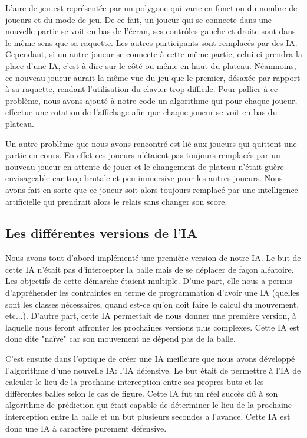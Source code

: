 L'aire de jeu est représentée par un polygone qui varie en fonction du nombre de joueurs et du mode de jeu. De ce fait, un joueur qui se connecte dans une nouvelle partie se voit en bas de l'écran, ses contrôles gauche et droite sont dans le même sens que sa raquette. Les autres participants sont remplacés par des IA. Cependant, si un autre joueur se connecte à cette même partie, celui-ci prendra la place d'une IA, c'est-à-dire sur le côté ou même en haut du plateau. Néanmoins, ce nouveau joueur aurait la même vue du jeu que le premier, désaxée par rapport à sa raquette, rendant l'utilisation du clavier trop difficile. Pour pallier à ce problème, nous avons ajouté à notre code un algorithme qui pour chaque joueur, effectue une rotation de l'affichage afin que chaque joueur se voit en bas du plateau.


Un autre problème que nous avons rencontré est lié aux joueurs qui quittent une partie en cours. En effet ces joueurs n'étaient pas toujours remplacés par un nouveau joueur en attente de jouer et le changement de plateau n'était guère envisageable car trop brutale et peu immersive pour les autres joueurs. Nous avons fait en sorte que ce joueur soit alors toujours remplacé par une intelligence artificielle qui prendrait alors le relais sans changer son score.

\subsection{Les différentes versions de l'IA}

Nous avons tout d'abord implémenté une première version de notre IA. Le but de cette IA n'était pas d'intercepter la balle mais de se déplacer de façon aléatoire. Les objectifs de cette démarche étaient multiple. D'une part, elle nous a permis d'appréhender les contraintes en terme de programmation d'avoir une IA (quelles sont les classes nécessaires, quand est-ce qu'on doit faire le calcul du mouvement, etc...). D'autre part, cette IA permettait de nous donner une première version, à laquelle nous feront affronter les prochaines versions plus complexes. Cette IA est donc dite "naïve" car son mouvement ne dépend pas de la balle.


C'est ensuite dans l'optique de créer une IA meilleure que nous avons développé l'algorithme d'une nouvelle IA: l'IA défensive. Le but était de permettre à l'IA de calculer le lieu de la prochaine interception entre ses propres buts et les différentes balles selon le cas de figure. Cette IA fut un réel succès dû à son algorithme de prédiction qui était capable de déterminer le lieu de la prochaine interception entre la balle et un but plusieurs secondes a l'avance. Cette IA est donc une IA à caractère purement défensive.


